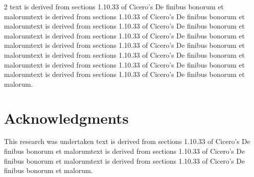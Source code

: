 \documentclass[a0,portrait]{a0poster}
\begin{document}
\begin{minipage}[c]{\linewidth}
\begin{framed}
\begin{multicols}{2}
text is derived from sections 1.10.33 of Cicero's De finibus bonorum et malorumtext is derived from sections 1.10.33 of Cicero's De finibus bonorum et malorumtext is derived from sections 1.10.33 of Cicero's De finibus bonorum et malorumtext is derived from sections 1.10.33 of Cicero's De finibus bonorum et malorumtext is derived from sections 1.10.33 of Cicero's De finibus bonorum et malorumtext is derived from sections 1.10.33 of Cicero's De finibus bonorum et malorumtext is derived from sections 1.10.33 of Cicero's De finibus bonorum et malorumtext is derived from sections 1.10.33 of Cicero's De finibus bonorum et malorum.
\section*{Acknowledgments}
\tiny \textnormal{This research was undertaken text is derived from sections 1.10.33 of Cicero's De finibus bonorum et malorumtext is derived from sections 1.10.33 of Cicero's De finibus bonorum et malorumtext is derived from sections 1.10.33 of Cicero's De finibus bonorum et malorum.}
\end{multicols}
\vspace{0.5cm}
\end{framed}
\end{minipage}
\end{document}
